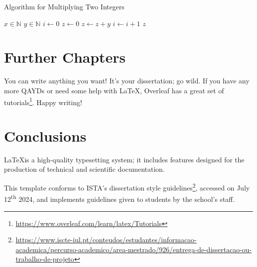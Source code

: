 \documentclass[12pt,reqno,twoside]{amsbook}
\begin{document}
\begin{algorithm}
    \caption{Algorithm for Multiplying Two Integers}
    \begin{algorithmic}
        \Require $x\in\mathbb{N}$
        \Require $y\in\mathbb{N}$
        \State $i \gets 0$
        \State $z \gets 0$
            \State $z \gets z + y$
            \State $i \gets i + 1$
        \EndWhile
        \State \Return $z$
    \end{algorithmic}
    \label{alg:example}
\end{algorithm}










\chapter{Further Chapters}

You can write anything you want! It's your dissertation; go wild. If you have any more \acp{QAYD} or need some help with \LaTeX, Overleaf has a great set of tutorials\footnote{\url{https://www.overleaf.com/learn/latex/Tutorials}}. Happy writing!










\chapter{Conclusions}

\LaTeX\space is a high-quality typesetting system; it includes features designed for the production of technical and scientific documentation.

This template conforms to ISTA's dissertation style guidelines\footnote{\url{https://www.iscte-iul.pt/conteudos/estudantes/informacao-academica/percurso-academico/area-mestrado/926/entrega-de-dissertacao-ou-trabalho-de-projeto}}, accessed on July 12\textsuperscript{th} 2024, and implements guidelines given to students by the school's staff.
\end{document}
